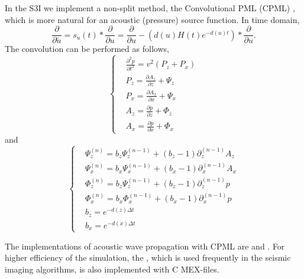 \documentclass[11pt,titlepage]{article}
\theoremstyle{plain}
\theoremstyle{definition}
\theoremstyle{remark}
\numberwithin{equation}{section}
\begin{document}
In the S3I we implement a non-split method, the Convolutional PML (CPML) \cite{Luebbers:1992aa, Roden:2000aa, Komatitsch:2007aa}, which is more natural for an acoustic (pressure) source function. In time domain,
 \begin{equation}
    \frac{\partial}{\partial \tilde{u}} = s_u(t) * \frac{\partial}{\partial u} = \frac{\partial}{\partial u} - \left(d(u)H(t)e^{-d(u)t}\right) * \frac{\partial}{\partial u}.
  \end{equation}
The convolution can be performed as follows,
  \begin{equation}
  \label{eq:fwdTimeCpml}
  \left\{
  \begin{aligned}
  &\frac{\partial^2 p}{\partial t^2}=v^2(P_z+P_x)\\
  &P_z=\frac{\partial A_z}{\partial z}+\Psi_z\\
  &P_x=\frac{\partial A_x}{\partial x}+\Psi_x\\
  &A_z=\frac{\partial p}{\partial z}+\Phi_z\\
  &A_x=\frac{\partial p}{\partial x}+\Phi_x
  \end{aligned}
  \right.
  \end{equation}
  and  
  \begin{equation}
  \label{eq:fwdTimeCpml_var}
  \left\{
  \begin{aligned}
  &\Psi_z^{(n)}=b_z\Psi_z^{(n-1)}+(b_z-1)\partial_z^{(n-1)}A_z\\
  &\Psi_x^{(n)}=b_x\Psi_x^{(n-1)}+(b_x-1)\partial_x^{(n-1)}A_x\\
  &\Phi_z^{(n)}=b_z\Psi_z^{(n-1)}+(b_z-1)\partial_z^{(n-1)}p\\
  &\Phi_x^{(n)}=b_x\Phi_x^{(n-1)}+(b_x-1)\partial_x^{(n-1)}p\\
  &b_z = e^{-d(z)\Delta t}\\
  &b_x = e^{-d(x)\Delta t}
  \end{aligned}
  \right.
  \end{equation}

The implementations of acoustic wave propagation with CPML are  and . For higher efficiency of the simulation, the , which is used frequently in the seismic imaging algorithms, is also implemented with C MEX-files. 
\end{document}
